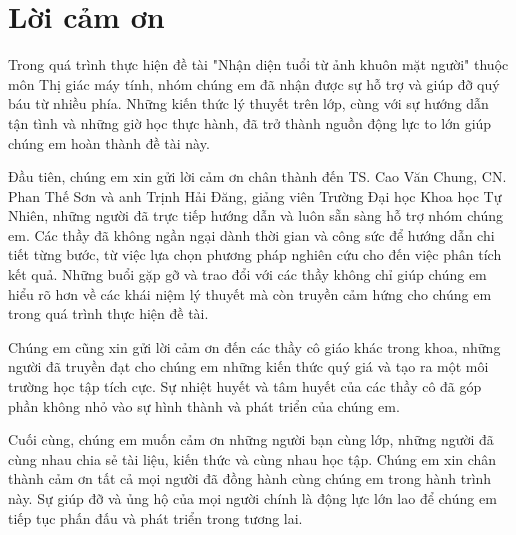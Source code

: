 \chapter*{Lời cảm ơn}

Trong quá trình thực hiện đề tài 
"Nhận diện tuổi từ ảnh khuôn mặt người" 
thuộc môn Thị giác máy tính, nhóm chúng em đã nhận được sự 
hỗ trợ và giúp đỡ quý báu từ nhiều phía. Những 
kiến thức lý thuyết trên lớp, cùng với sự hướng 
dẫn tận tình và những giờ học thực hành, đã 
trở thành nguồn động lực to lớn giúp chúng em 
hoàn thành đề tài này. 

Đầu tiên, chúng em xin 
gửi lời cảm ơn chân thành đến 
TS. Cao Văn Chung, CN. Phan Thế Sơn và anh Trịnh Hải Đăng, 
giảng viên Trường Đại học Khoa học Tự Nhiên, 
những người đã trực tiếp hướng dẫn và luôn sẵn 
sàng hỗ trợ nhóm chúng em. Các thầy đã không ngần 
ngại dành thời gian và công sức để hướng dẫn 
chi tiết từng bước, từ việc lựa chọn phương pháp 
nghiên cứu cho đến việc phân tích kết quả. 
Những buổi gặp gỡ và trao đổi với các thầy không 
chỉ giúp chúng em hiểu rõ hơn về các khái niệm 
lý thuyết mà còn truyền cảm hứng cho chúng em 
trong quá trình thực hiện đề tài. 

Chúng em cũng 
xin gửi lời cảm ơn đến các thầy cô giáo khác 
trong khoa, những người đã truyền đạt cho chúng 
em những kiến thức quý giá và tạo ra một môi 
trường học tập tích cực. Sự nhiệt huyết và tâm 
huyết của các thầy cô đã góp phần không nhỏ 
vào sự hình thành và phát triển của chúng em. 

Cuối cùng, chúng em muốn cảm ơn những người bạn 
cùng lớp, những người đã cùng nhau chia sẻ tài 
liệu, kiến thức và cùng nhau học tập. Chúng em 
xin chân thành cảm ơn tất cả mọi người đã đồng 
hành cùng chúng em trong hành trình này. Sự giúp 
đỡ và ủng hộ của mọi người chính là động lực lớn 
lao để chúng em tiếp tục phấn đấu và phát triển 
trong tương lai.
